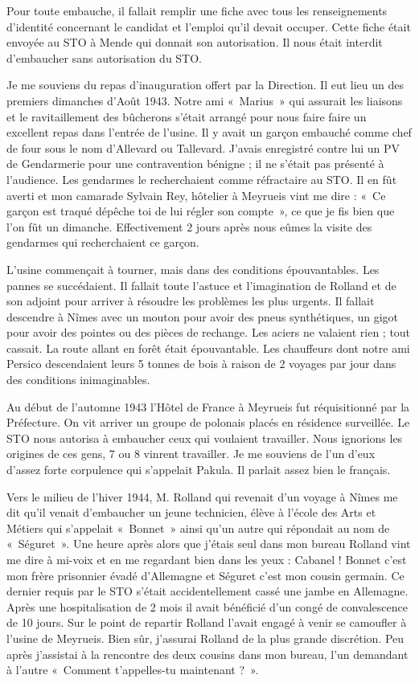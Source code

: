 Pour toute embauche, il fallait remplir une fiche avec tous les renseignements d’identité
concernant le candidat et l’emploi qu’il devait occuper. Cette fiche était envoyée au STO à
Mende qui donnait son autorisation. Il nous était interdit d’embaucher sans autorisation du
STO.

Je me souviens du repas d’inauguration offert par la Direction. Il eut lieu un des premiers
dimanches d’Août 1943. Notre ami «~Marius~» qui assurait les liaisons et le ravitaillement des
bûcherons s’était arrangé pour nous faire faire un excellent repas dans l’entrée de l’usine. Il y
avait un garçon embauché comme chef de four sous le nom d’Allevard ou Tallevard. J’avais
enregistré contre lui un PV de Gendarmerie pour une contravention bénigne ; il ne s’était pas
présenté à l’audience. Les gendarmes le recherchaient comme réfractaire au STO. Il en fût
averti et mon camarade Sylvain Rey, hôtelier à Meyrueis vint me dire : «~Ce garçon est traqué dépêche toi de lui régler son compte~», ce que je fis bien que l’on fût un dimanche.
Effectivement 2 jours après nous eûmes la visite des gendarmes qui recherchaient ce garçon.

L’usine commençait à tourner, mais dans des conditions épouvantables. Les pannes se
succédaient. Il fallait toute l’astuce et l’imagination de Rolland et de son adjoint pour arriver à
résoudre les problèmes les plus urgents. Il fallait descendre à Nîmes avec un mouton pour
avoir des pneus synthétiques, un gigot pour avoir des pointes ou des pièces de rechange. Les
aciers ne valaient rien ; tout cassait. La route allant en forêt était épouvantable. Les chauffeurs
dont notre ami Persico descendaient leurs 5 tonnes de bois à raison de 2 voyages par jour dans
des conditions inimaginables.

Au début de l’automne 1943 l’Hôtel de France à Meyrueis fut réquisitionné par la Préfecture.
On vit arriver un groupe de polonais placés en résidence surveillée. Le STO nous autorisa à
embaucher ceux qui voulaient travailler. Nous ignorions les origines de ces gens, 7 ou 8
vinrent travailler. Je me souviens de l’un d’eux d’assez forte corpulence qui s’appelait Pakula.
Il parlait assez bien le français.

Vers le milieu de l’hiver 1944, M. Rolland qui revenait d’un voyage à Nîmes me dit qu’il
venait d’embaucher un jeune technicien, élève à l’école des Arts et Métiers qui s’appelait
«~Bonnet~» ainsi qu’un autre qui répondait au nom de «~Séguret~». Une heure après alors que
j’étais seul dans mon bureau Rolland vint me dire à mi-voix et en me regardant bien dans les
yeux : Cabanel ! Bonnet c’est mon frère prisonnier évadé d’Allemagne et Séguret c’est mon
cousin germain. Ce dernier requis par le STO s’était accidentellement cassé une jambe en
Allemagne. Après une hospitalisation de 2 mois il avait bénéficié d’un congé de
convalescence de 10 jours. Sur le point de repartir Rolland l’avait engagé à venir se camoufler
à l’usine de Meyrueis. Bien sûr, j’assurai Rolland de la plus grande discrétion. Peu après
j’assistai à la rencontre des deux cousins dans mon bureau, l’un demandant à l’autre
«~Comment t’appelles-tu maintenant ?~».

